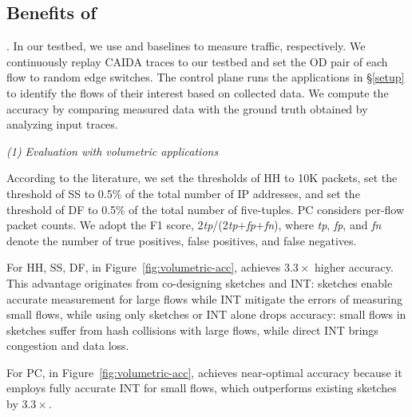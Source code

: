 \subsection{Benefits of \sysname}

. 
In our testbed, we use \sysname and baselines to measure traffic, respectively. We continuously replay CAIDA traces \cite{caida} to our testbed and set the OD pair of each flow to random edge switches. The control plane runs the applications in \S\ref{setup} to identify the flows of their interest based on collected data. We compute the accuracy by comparing measured data with the ground truth obtained by analyzing input traces. 


\noindent \emph{(1) Evaluation with volumetric applications}

According to the literature, we set the thresholds of HH to 10K packets, set the threshold of SS to 0.5\% of the total number of IP addresses, and set the threshold of DF to 0.5\% of the total number of five-tuples. PC considers per-flow packet counts. We adopt the F1 score, 2\emph{tp}/(2\emph{tp}+\emph{fp}+\emph{fn}), where \emph{tp}, \emph{fp}, and \emph{fn} denote the number of true positives, false positives, and false negatives. 


For HH, SS, DF, in Figure~\ref{fig:volumetric-acc}, \sysname achieves $3.3\times$ higher accuracy. This advantage originates from co-designing sketches and INT: sketches enable accurate measurement for large flows while INT mitigate the errors of measuring small flows, while using only sketches or INT alone drops accuracy: small flows in sketches suffer from hash collisions with large flows, while direct INT brings congestion and data loss. 

For PC, in Figure~\ref{fig:volumetric-acc}, \sysname achieves near-optimal accuracy because it employs fully accurate INT for small flows, which outperforms existing sketches by $3.3\times$.  

